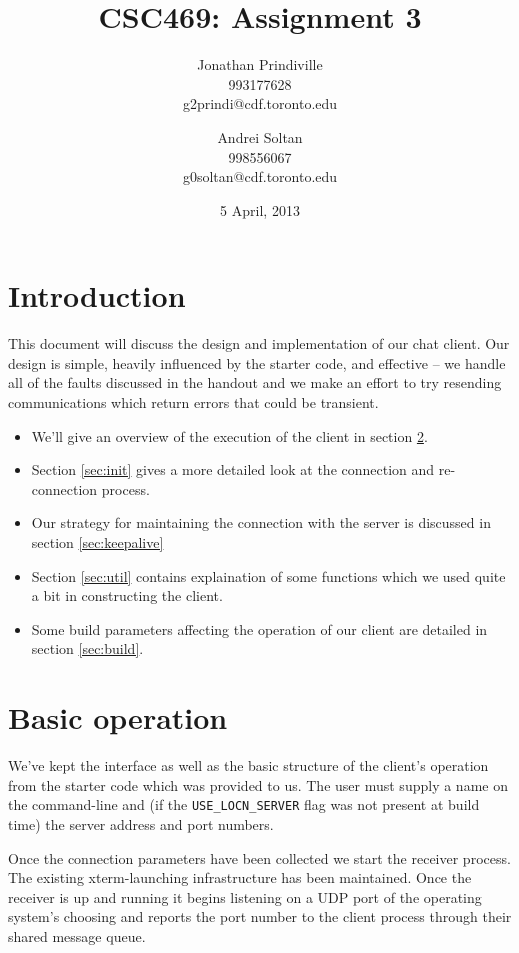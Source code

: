 \documentclass[12pt]{article}
\author {Jonathan Prindiville\\993177628\\g2prindi@cdf.toronto.edu
\and Andrei Soltan\\998556067\\g0soltan@cdf.toronto.edu}
\title{CSC469: Assignment 3}
\date{5 April, 2013}
\newcommand{\mono}[1]{\texttt{#1}}
\begin{document}
\maketitle

\tableofcontents

\newpage
\section{Introduction}
This document will discuss the design and implementation of our
chat client. Our design is simple, heavily influenced by the
starter code, and effective -- we handle all of the faults discussed
in the handout and we make an effort to try resending communications which
return errors that could be transient.
\begin{itemize}
\item We'll give an overview of the execution of the client in section
\ref{sec:basic}.

\item Section \ref{sec:init} gives a more detailed look at the connection and
re-connection process.

\item Our strategy for maintaining the connection with the server is discussed
in section \ref{sec:keepalive}

\item Section \ref{sec:util} contains explaination of some functions which we
used quite a bit in constructing the client.

\item Some build parameters affecting the operation of our client are detailed
in section \ref{sec:build}.
\end{itemize}

\section{Basic operation}
\label{sec:basic}
We've kept the interface as well as the basic structure
 of the client's operation from the starter code which was
provided to us. The user must supply a name on the command-line and (if the
\mono{USE\_LOCN\_SERVER}
flag was not present at build time) the server address and port numbers.

Once the connection parameters have been collected we start the
receiver process. The existing xterm-launching infrastructure has been
maintained. Once the receiver is up and running it begins listening
on a UDP port of the operating system's choosing and reports the port
number to the client process through their shared message queue.
\end{document}
